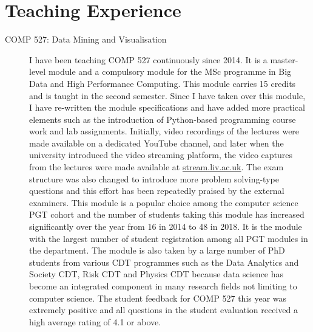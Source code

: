 \documentclass[a4paper,11pt]{article}
\begin{document}


%

\section{Teaching Experience}

\begin{description}
\item[COMP 527: Data Mining and Visualisation]
I have been teaching COMP 527 continuously since 2014. It is a master-level module and a compulsory module for the MSc programme in Big Data and High Performance Computing. This module carries 15 credits and is taught in the second semester.
Since I have taken over this module, I have re-written the module specifications and have added more practical elements such as the introduction of Python-based programming course work and lab assignments. 
Initially, video recordings of the lectures were made available on a dedicated YouTube channel, and later when the university introduced the video streaming platform, the video captures from the lectures were made available at \url{stream.liv.ac.uk}. 
The exam structure was also changed to introduce more problem solving-type questions and this effort has been repeatedly praised by the external examiners.
This module is a popular choice among the computer science PGT cohort and the number of students taking this module has increased significantly over the year from 16 in 2014 to 48 in 2018. It is the module with the largest number of student registration among all PGT modules in the department.
The module is also taken by a large number of PhD students from various CDT programmes such as the Data Analytics and Society CDT,
Risk CDT and Physics CDT because data science has become an integrated component in many research fields not limiting to computer science.
The student feedback for COMP 527 this year was extremely positive and all questions in the student evaluation received a high average rating of 4.1 or above.


\end{description}
\end{document}
